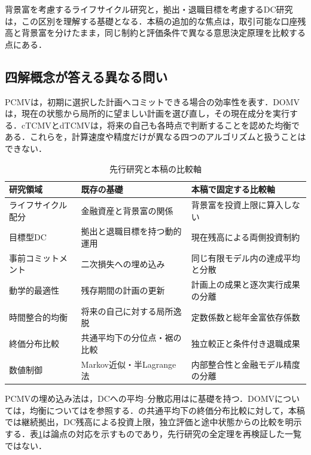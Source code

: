 \documentclass[11pt,a4paper]{article}
\numberwithin{equation}{section}
\numberwithin{table}{section}
\numberwithin{figure}{section}
\theoremstyle{plain}
\theoremstyle{definition}
\begin{document}
背景富を考慮するライフサイクル研究\citep{Merton1969,BodieMertonSamuelson1992,Viceira2001}と，拠出・退職目標を考慮するDC研究\citep{VignaHaberman2001,HabermanVigna2002,CairnsBlakeDowd2006}は，この区別を理解する基礎となる．本稿の追加的な焦点は，取引可能な口座残高と背景富を分けたまま，同じ制約と評価条件で異なる意思決定原理を比較する点にある．

\subsection{四解概念が答える異なる問い}
PCMVは，初期に選択した計画へコミットできる場合の効率性を表す．DOMVは，現在の状態から局所的に望ましい計画を選び直し，その現在成分を実行する．cTCMVとdTCMVは，将来の自己も各時点で判断することを認めた均衡である．これらを，計算速度や精度だけが異なる四つのアルゴリズムと扱うことはできない．

\begin{table}[htbp]\centering\small
\caption{先行研究と本稿の比較軸}\label{tab:literature-map}
\begin{tabularx}{\textwidth}{p{31mm}XX}\toprule
研究領域 & 既存の基礎 & 本稿で固定する比較軸\\\midrule
ライフサイクル配分 & 金融資産と背景富の関係 & 背景富を投資上限に算入しない\\
目標型DC & 拠出と退職目標を持つ動的運用 & 現在残高による両側投資制約\\
事前コミットメント & 二次損失への埋め込み & 同じ有限モデル内の達成平均と分散\\
動学的最適性 & 残存期間の計画の更新 & 計画上の成果と逐次実行成果の分離\\
時間整合的均衡 & 将来の自己に対する局所逸脱 & 定数係数と総年金富依存係数\\
終価分布比較 & 共通平均下の分位点・裾の比較 & 独立較正と条件付き退職成果\\
数値制御 & Markov近似・半Lagrange法 & 内部整合性と金融モデル精度の分離\\\bottomrule
\end{tabularx}
\end{table}

PCMVの埋め込み法は\citet{LiNg2000,ZhouLi2000}，DCへの平均--分散応用は\citet{Vigna2014,MenoncinVigna2017}に基礎を持つ．DOMVについては\citet{PedersenPeskir2017,MenoncinVigna2020}，均衡については\citet{BasakChabakauri2010,BjorkMurgociZhou2014,BjorkKhapkoMurgoci2017}を参照する．\citet{vanStadenDangForsyth2021}の共通平均下の終価分布比較に対して，本稿では継続拠出，DC残高による投資上限，独立評価と途中状態からの比較を明示する．表\ref{tab:literature-map}は論点の対応を示すものであり，先行研究の全定理を再検証した一覧ではない．
\end{document}
